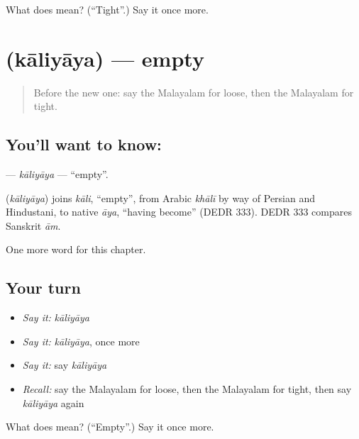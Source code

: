 \begin{tcolorbox}[breakable,colback=teal!4,colframe=teal!35!black,title={Before you move on}]
What does  mean? (\textquotedblleft{}Tight\textquotedblright{}.) Say it once more.
\end{tcolorbox}
\section[\texorpdfstring{\ml{കാലിയായ} (kāliyāya)}{കാലിയായ (kāliyāya)}]{ (kāliyāya) — empty}

\label{lesson:ML-C203-kaliyaya}



\begin{quote}
Before the new one: say the Malayalam for loose, then the Malayalam for tight.
\end{quote}

\subsection*{You'll want to know: }
\textbf{} — \emph{kāliyāya} — \textquotedblleft{}empty\textquotedblright{}.

\begin{cousinweb}
\textbf{} (\emph{kāliyāya}) joins \emph{kāli}, \textquotedblleft{}empty\textquotedblright{}, from Arabic \emph{khālī} by way of Persian and Hindustani, to native \emph{āya}, \textquotedblleft{}having become\textquotedblright{} (DEDR 333). DEDR 333 compares Sanskrit \emph{ām}.
\end{cousinweb}

\begin{grammarlens}[title={What you've built}]
One more word for this chapter.
\end{grammarlens}

\subsection*{Your turn}
\begin{itemize}
\raggedright
  \item \emph{Say it:} \emph{kāliyāya}
  \item \emph{Say it:} \emph{kāliyāya}, once more
  \item \emph{Say it:} say \emph{kāliyāya}
  \item \emph{Recall:} say the Malayalam for loose, then the Malayalam for tight, then say \emph{kāliyāya} again
\end{itemize}

\begin{tcolorbox}[breakable,colback=teal!4,colframe=teal!35!black,title={Before you move on}]
What does  mean? (\textquotedblleft{}Empty\textquotedblright{}.) Say it once more.
\end{tcolorbox}
